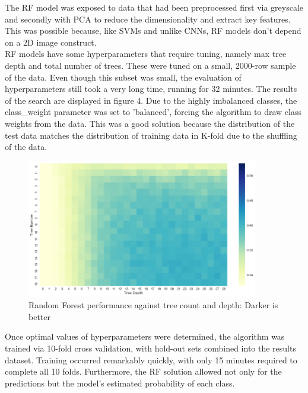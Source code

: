 \documentclass[11pt]{article}
\begin{document}
The RF model was exposed to data that had been preprocessed first via greyscale and secondly with PCA to reduce the dimensionality and extract key features. This was possible because, like SVMs and unlike CNNs, RF models don't depend on a 2D image construct.\\

RF models have some hyperparameters that require tuning, namely max tree depth and total number of trees. These were tuned on a small, 2000-row sample of the data. Even though this subset was small, the evaluation of hyperparameters still took a very long time, running for 32 minutes. The results of the search are displayed in figure 4.  Due to the highly imbalanced classes, the class\_weight parameter was set to 'balanced', forcing the algorithm to draw class weights from the data. This was a good solution because the distribution of the test data matches the distribution of training data in K-fold due to the shuffling of the data.
\\
\begin{figure}[h]
\caption{Random Forest performance against tree count and depth: Darker is better}
\centering
\includegraphics[width=0.9\textwidth]{images/random_forest_hyperparams.png}
\end{figure}


Once optimal values of hyperparameters were determined, the algorithm was trained via 10-fold cross validation, with hold-out sets combined into the results dataset. Training occurred remarkably quickly, with only 15 minutes required to complete all 10 folds. Furthermore, the RF solution allowed not only for the predictions but the model's estimated probability of each class.
\end{document}
